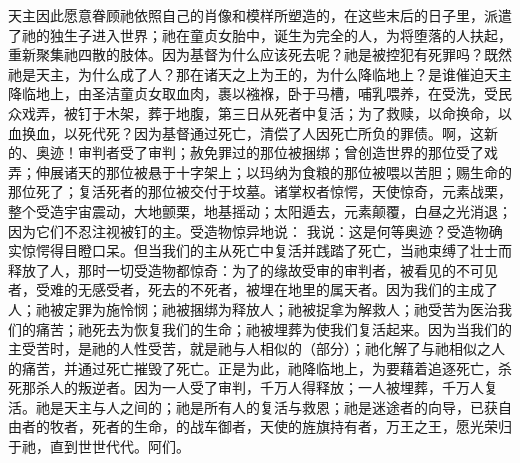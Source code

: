 天主因此愿意眷顾祂依照自己的肖像和模样所塑造的，在这些末后的日子里，派遣了祂的独生子进入世界；祂在童贞女胎中，诞生为完全的人，为将堕落的人扶起，重新聚集祂四散的肢体。因为基督为什么应该死去呢？祂是被控犯有死罪吗？既然祂是天主，为什么成了人？那在诸天之上为王的，为什么降临地上？是谁催迫天主降临地上，由圣洁童贞女取血肉，裹以襁褓，卧于马槽，哺乳喂养，在受洗，受民众戏弄，被钉于木架，葬于地腹，第三日从死者中复活；为了救赎，以命换命，以血换血，以死代死？因为基督通过死亡，清偿了人因死亡所负的罪债。啊，这新的、奥迹！审判者受了审判；赦免罪过的那位被捆绑；曾创造世界的那位受了戏弄；伸展诸天的那位被悬于十字架上；以玛纳为食粮的那位被喂以苦胆；赐生命的那位死了；复活死者的那位被交付于坟墓。诸掌权者惊愕，天使惊奇，元素战栗，整个受造宇宙震动，大地颤栗，地基摇动；太阳遁去，元素颠覆，白昼之光消退；因为它们不忍注视被钉的主。受造物惊异地说： 我说：这是何等奥迹？受造物确实惊愕得目瞪口呆。但当我们的主从死亡中复活并践踏了死亡，当祂束缚了壮士而释放了人，那时一切受造物都惊奇：为了的缘故受审的审判者，被看见的不可见者，受难的无感受者，死去的不死者，被埋在地里的属天者。因为我们的主成了人；祂被定罪为施怜悯；祂被捆绑为释放人；祂被捉拿为解救人；祂受苦为医治我们的痛苦；祂死去为恢复我们的生命；祂被埋葬为使我们复活起来。因为当我们的主受苦时，是祂的人性受苦，就是祂与人相似的（部分）；祂化解了与祂相似之人的痛苦，并通过死亡摧毁了死亡。正是为此，祂降临地上，为要藉着追逐死亡，杀死那杀人的叛逆者。因为一人受了审判，千万人得释放；一人被埋葬，千万人复活。祂是天主与人之间的；祂是所有人的复活与救恩；祂是迷途者的向导，已获自由者的牧者，死者的生命，的战车御者，天使的旌旗持有者，万王之王，愿光荣归于祂，直到世世代代。阿们。\par

